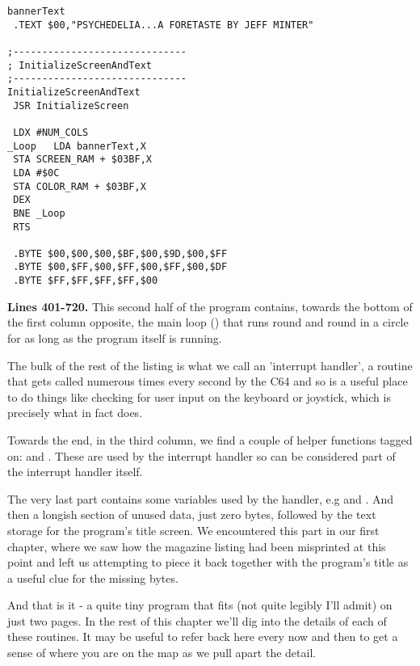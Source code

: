 \begin{minipage}[b]{0.33\linewidth}
\begin{lrbox}{\mybox}
\begin{lstlisting}[basicstyle=\ttfamily\tiny]
bannerText   
 .TEXT $00,"PSYCHEDELIA...A FORETASTE BY JEFF MINTER"

;------------------------------
; InitializeScreenAndText
;------------------------------
InitializeScreenAndText   
 JSR InitializeScreen

 LDX #NUM_COLS
_Loop   LDA bannerText,X
 STA SCREEN_RAM + $03BF,X
 LDA #$0C
 STA COLOR_RAM + $03BF,X
 DEX 
 BNE _Loop
 RTS 

 .BYTE $00,$00,$00,$BF,$00,$9D,$00,$FF
 .BYTE $00,$FF,$00,$FF,$00,$FF,$00,$DF
 .BYTE $FF,$FF,$FF,$FF,$00

\end{lstlisting}
\end{lrbox}%
\scalebox{0.8}{\usebox{\mybox}}
\end{minipage}
\clearpage
\textbf{Lines 401-720. } This second half of the program contains, towards the bottom of the first column
opposite, the main loop () that
runs round and round in a circle for as long as the program itself is running. 

The bulk of the rest of the listing
is what we call an 'interrupt handler', a routine that gets called numerous times every second by the C64
and so is a useful place to do things like checking for user input on the keyboard or joystick, which
is precisely what  in fact does.

Towards the end, in the third column, we find a couple of helper functions tagged on: 
and . These are used by the interrupt handler so can be considered part
of the interrupt handler itself. 

The very last part contains some variables used by the handler, e.g  and .
And then a longish section of unused data, just zero bytes, followed by the text storage for the program's title
screen. We encountered this part in our first chapter, where we saw how the magazine listing had been misprinted
at this point and left us attempting to piece it back together with the program's title as a useful clue for the
missing bytes.

And that is it - a quite tiny program that fits (not quite legibly I'll admit) on just two pages. In the rest of
this chapter we'll dig into the details of each of these routines. It may be useful to refer back here every now
and then to get a sense of where you are on the map as we pull apart the detail.

\clearpage

